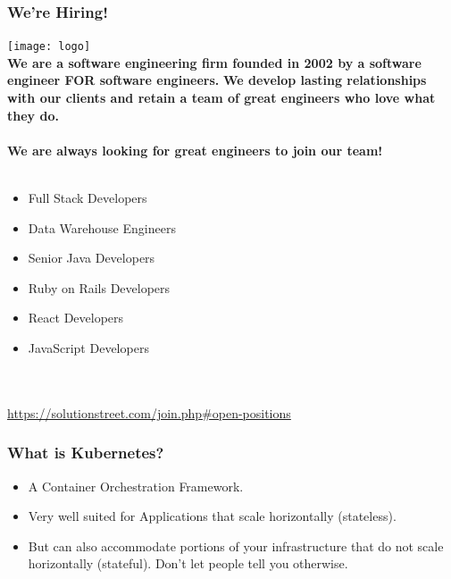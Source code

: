     \begin{frame}
        \frametitle{We're Hiring!}
        \begin{center}
            \texttt{[image: logo]}\\
            \textbf{We are a software engineering firm founded in 2002 by a software engineer FOR software engineers.}
            \textbf{We develop lasting relationships with our clients and retain a team of great engineers who love what they do.}\\~\\
            \textbf{We are always looking for great engineers to join our team!}\\~\\
            \begin{minipage}{0.45\textwidth}
                \begin{itemize}
                    \item{Full Stack Developers}
                    \item{Data Warehouse Engineers}
                    \item{Senior Java Developers}
                    \item{Ruby on Rails Developers}
                    \item{React Developers}
                    \item{JavaScript Developers}
                \end{itemize}
            \end{minipage}
            \\~\\
            \href{https://solutionstreet.com/join.php}{https://solutionstreet.com/join.php\#open-positions}
        \end{center}

    \end{frame}

    \begin{frame}
        \frametitle{What is Kubernetes?}
        \begin{itemize}
            \item{A Container Orchestration Framework.}\pause
            \item{Very well suited for Applications that scale horizontally (stateless).}\pause
            \item{But can also accommodate portions of your infrastructure that do not scale horizontally (stateful). Don't let people tell you otherwise.}
        \end{itemize}
    \end{frame}

